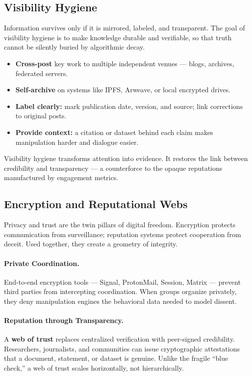 \documentclass[12pt,twoside]{book}
\begin{document}
\subsection*{Visibility Hygiene}

Information survives only if it is mirrored, labeled, and transparent.  
The goal of visibility hygiene is to make knowledge durable and verifiable, so that truth cannot be silently buried by algorithmic decay.

\begin{itemize}
  \item \textbf{Cross-post} key work to multiple independent venues --- blogs, archives, federated servers.  
  \item \textbf{Self-archive} on systems like IPFS, Arweave, or local encrypted drives.  
  \item \textbf{Label clearly:} mark publication date, version, and source; link corrections to original posts.  
  \item \textbf{Provide context:} a citation or dataset behind each claim makes manipulation harder and dialogue easier.
\end{itemize}

Visibility hygiene transforms attention into evidence.  
It restores the link between credibility and transparency --- a counterforce to the opaque reputations manufactured by engagement metrics.

\subsection*{Encryption and Reputational Webs}

Privacy and trust are the twin pillars of digital freedom.  
Encryption protects communication from surveillance; reputation systems protect cooperation from deceit.  
Used together, they create a geometry of integrity.

\paragraph{Private Coordination.}
End-to-end encryption tools --- Signal, ProtonMail, Session, Matrix --- prevent third parties from intercepting coordination.  
When groups organize privately, they deny manipulation engines the behavioral data needed to model dissent.

\paragraph{Reputation through Transparency.}
A \textbf{web of trust} replaces centralized verification with peer-signed credibility.  
Researchers, journalists, and communities can issue cryptographic attestations that a document, statement, or dataset is genuine.  
Unlike the fragile ``blue check,'' a web of trust scales horizontally, not hierarchically.
\end{document}
